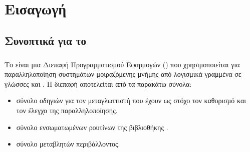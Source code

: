 \section{Εισαγωγή}
\subsection{Συνοπτικά για το }
\subparagraph{}
Το  είναι μια Διεπαφή Προγραμματισμού Εφαρμογών (\emph{}) που χρησιμοποιείται για
παραλληλοποίηση συστημάτων μοιραζόμενης μνήμης από λογισμικά γραμμένα σε γλώσσες
\textbf{} και \textbf{}. Η διεπαφή αποτελείται από τα παρακάτω
σύνολα\cite{thenextstep20}:
\begin{spacing}{1.1}
\begin{itemize}
    \item σύνολο οδηγιών \textbf{} για τον μεταγλωττιστή που έχουν ως στόχο τον
    καθορισμό και τον έλεγχο της παραλληλοποίησης.
    \item σύνολο ενσωματωμένων ρουτίνων της βιβλιοθήκης .
    \item σύνολο μεταβλητών περιβάλλοντος.
\end{itemize}
\end{spacing}


